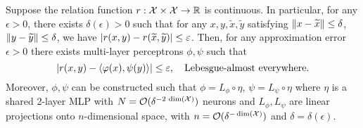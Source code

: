 \begin{theorem}\label{theorem:asymemtric_inner_prod_rel_func_class}
    Suppose the relation function $r: {\mathcal{X}} \times {\mathcal{X}} \to \mathbb{R}$ is continuous. In particular, for any $\epsilon > 0$, there exists $\delta(\epsilon) > 0$ such that for any $x, y, \tilde{x}, \tilde{y}$ satisfying $\left\lVert x - \widetilde{x}\right\rVert \leq \delta$, $\left\lVert y - \widetilde{y}\right\rVert \leq \delta$, we have $\left\lvert r(x, y) - r(\widetilde{x}, \widetilde{y})\right\rvert \leq \varepsilon$. Then, for any approximation error $\epsilon > 0$ there exists multi-layer perceptrons $\phi, \psi$ such that
    \begin{equation*}
        \abs{r(x,y) - \iprod{\phi(x)}{\psi(y)}} \leq \epsilon, \quad \text{Lebesgue-almost everywhere.}
    \end{equation*}
    Moreover, $\phi, \psi$ can be constructed such that $\phi = L_\phi \circ \eta$, $\psi = L_\psi \circ \eta$ where $\eta$ is a shared 2-layer MLP with $N = {\mathcal{O}}(\delta^{- 2 \,\dim({\mathcal{X}})})$ neurons and $L_\phi, L_\psi$ are linear projections onto $n$-dimensional space, with $n = {\mathcal{O}}(\delta^{- \dim({\mathcal{X}})})$ and $\delta = \delta(\epsilon)$.
\end{theorem}
